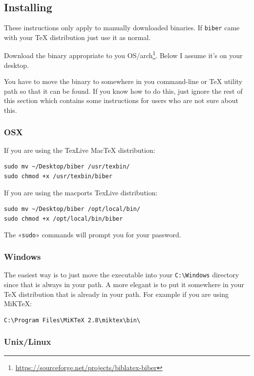 \documentclass{ltxdockit}
\begin{document}
\subsection{Installing}

These instructions only apply to manually downloaded binaries. If
\verb+biber+ came with your TeX distribution just use it as normal.

Download the binary appropriate to you
OS/arch\footnote{\url{https://sourceforge.net/projects/biblatex-biber}}. Below
I assume it's on your desktop.

You have to move the binary to somewhere in you command-line or TeX utility
path so that it can be found. If you know how to do this, just ignore the
rest of this section which contains some instructions for users who are
not sure about this.

\subsubsection{OSX}

If you are using the TexLive MacTeX distribution:

\begin{verbatim}
sudo mv ~/Desktop/biber /usr/texbin/
sudo chmod +x /usr/texbin/biber
\end{verbatim}

\noindent If you are using the macports TexLive distribution:

\begin{verbatim}
sudo mv ~/Desktop/biber /opt/local/bin/
sudo chmod +x /opt/local/bin/biber
\end{verbatim}

\noindent The «\verb+sudo+» commands will prompt you for your password.

\subsubsection{Windows}

The easiest way is to just move the executable into your \verb+C:\Windows+ directory since
that is always in your path. A more elegant is to put it somewhere in
your TeX distribution that is already in your path. For example if you
are using MiKTeX:

\begin{verbatim}
C:\Program Files\MiKTeX 2.8\miktex\bin\
\end{verbatim}

\subsubsection{Unix/Linux}
\end{document}
